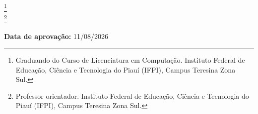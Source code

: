 
\imprimircapa

\imprimirfolhaderosto

\begin{center}{\ABNTEXchapterfont\bfseries\MakeUppercase{\imprimirtitulo}}
\end{center}

\flushright

      \autornomecompleto\footnote{Graduando do Curso de Licenciatura em Computação. Instituto Federal de Educação, Ciência e Tecnologia do Piauí (IFPI), Campus Teresina Zona Sul.} \\
      \profnomecompleto\footnote{Professor orientador. Instituto Federal de Educação, Ciência e Tecnologia do Piauí (IFPI), Campus Teresina Zona Sul.}

\justifying





\noindent\textbf{Data de aprovação:} 11/08/2026

\vspace{\onelineskip}
